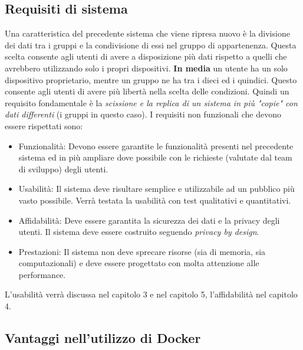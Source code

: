 \documentclass[a4paper,10pt]{memoir}
\begin{document}
\subsection{Requisiti di sistema}
Una caratteristica del precedente sistema che viene ripresa nuovo è la divisione dei dati tra i gruppi e la condivisione di essi nel gruppo di appartenenza.
Questa scelta consente agli utenti di avere a disposizione più dati rispetto a quelli che avrebbero utilizzando solo i propri dispositivi. \textbf{In media} un utente ha un solo dispositivo proprietario, mentre un gruppo ne ha tra i dieci ed i quindici.
Questo consente agli utenti di avere più libertà nella scelta delle condizioni.
Quindi un requisito fondamentale è la \textit{scissione e la replica di un sistema in più "copie" con dati differenti} (i gruppi in questo caso).
I requisiti non funzionali che devono essere rispettati sono:

\begin{itemize}
    \item Funzionalità: Devono essere garantite le funzionalità presenti nel precedente sistema ed in più ampliare dove possibile con le richieste (valutate dal team di sviluppo) degli utenti.
    \item Usabilità: Il sistema deve risultare semplice e utilizzabile ad un pubblico più vasto possibile. Verrà testata la usabilità con test qualitativi e quantitativi.
    \item Affidabilità: Deve essere garantita la sicurezza dei dati e la privacy degli utenti. Il sistema deve essere costruito seguendo \textit{privacy by design}.
    \item Prestazioni: Il sistema non deve sprecare risorse (sia di memoria, sia computazionali) e deve essere progettato con molta attenzione alle performance. 
\end{itemize}
L'usabilità verrà discussa nel capitolo 3 e nel capitolo 5,
l'affidabilità nel capitolo 4.

\clearpage


\subsection{Vantaggi nell'utilizzo di Docker}
\end{document}
